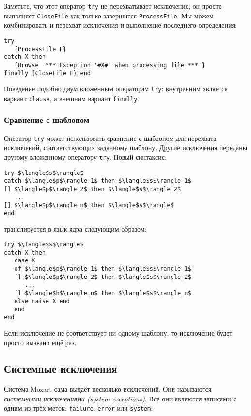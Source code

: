 Заметьте, что этот оператор \lstinline!try! не перехватывает исключение; он просто выполняет \lstinline!CloseFile! как только завершится \lstinline!ProcessFile!. Мы можем комбинировать и перехват исключения и выполнение последнего определения:

\begin{lstlisting}
try
   {ProcessFile F}
catch X then
   {Browse '*** Exception '#X#' when processing file ***'}
finally {CloseFile F} end
\end{lstlisting}

Поведение подобно двум вложенным операторам \lstinline!try!: внутренним является вариант \lstinline!clause!, а внешним вариант \lstinline!finally!.

\subsubsection{Сравнение с шаблоном}

Оператор \lstinline!try! может использовать сравнение с шаблоном для перехвата исключений, соответствующих заданному шаблону. Другие исключения переданы другому вложенному оператору \lstinline!try!. Новый синтаксис:

\begin{lstlisting}
try $\langle$s$\rangle$
catch $\langle$p$\rangle_1$ then $\langle$s$\rangle_1$
[] $\langle$p$\rangle_2$ then $\langle$s$\rangle_2$
   ...
[] $\langle$p$\rangle_n$ then $\langle$s$\rangle$
end
\end{lstlisting}

транслируется в язык ядра следующим образом:

\begin{lstlisting}
try $\langle$s$\rangle$
catch X then
   case X
   of $\langle$p$\rangle_1$ then $\langle$s$\rangle_1$
   [] $\langle$p$\rangle_2$ then $\langle$s$\rangle_2$
      ...
   [] $\langle$h$\rangle_n$ then $\langle$s$\rangle_n$
   else raise X end
   end
end
\end{lstlisting}

Если исключение не соответствует ни одному шаблону, то исключение будет просто вызвано ещё раз.

\subsection{Системные исключения}

Система Mozart сама выдаёт несколько исключений. Они называются \emph{системными исключениями (system exceptions)}. Все они являются записями с одним из трёх меток: \lstinline!failure!, \lstinline!error! или \lstinline!system!:

